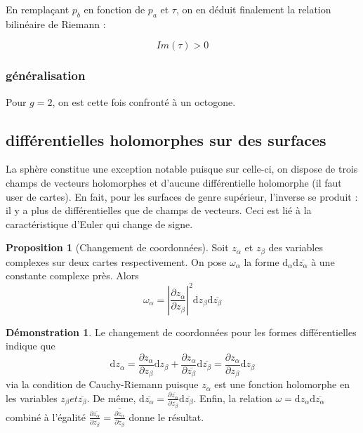 \documentclass{article}
\theoremstyle{definition} %
\newtheorem{prop}{Proposition}
\newtheorem{dem}{Démonstration}
\newcommand{\derp}[2]{\frac{\partial {#1}}{\partial {#2}}}
\newcommand{\dd}{ \mathrm{d}}
\newcommand{\1}{\mathbb{1}} %
\begin{document}
En remplaçant $p_b$ en fonction de $p_a$ et $\tau $, on en déduit finalement la relation bilinéaire de Riemann :

\begin{tcolorbox}[colback=blue!5!white,colframe=blue!75!black,title=Inégalité de Riemann]
$$Im(\tau) > 0$$
\end{tcolorbox}





\subsubsection{généralisation}

Pour $g=2$, on est cette fois confronté à un octogone. 




\subsection{différentielles holomorphes sur des surfaces}

\begin{tcolorbox}[colback=blue!5!white,colframe=blue!75!black,title=Principe]
    La sphère constitue une exception notable puisque sur celle-ci, on dispose de trois champs de vecteurs holomorphes et d'aucune différentielle holomorphe (il faut user de cartes).
    En fait, pour les surfaces de genre supérieur, l'inverse se produit : il y a plus de différentielles que de champs de vecteurs.
    Ceci est lié à la caractéristique d'Euler qui change de signe.
\end{tcolorbox}

\begin{prop}[Changement de coordonnées]
Soit $z_\alpha$ et $z_\beta$ des variables complexes sur deux cartes respectivement.
On pose $\omega_\alpha$ la forme $\dd_\alpha \dd \overline{z_\alpha}$ à une constante complexe près.
Alors 
$$\omega_\alpha=|\frac{\partial z_\alpha}{\partial z_\beta}|^2 \dd z_\beta \dd \overline{z_\beta}$$
\end{prop}

\begin{dem}
Le changement de coordonnées pour les formes différentielles indique que
$$\dd z_\alpha = \derp{z_\alpha}{z_\beta} \dd z_\beta + \derp{z_\alpha}{\overline{z_\beta}} \dd \overline{z_\beta}=\derp{z_\alpha}{z_\beta} \dd z_\beta$$ via la condition de Cauchy-Riemann puisque $z_\alpha$ est une fonction holomorphe en les variables $z_\beta et \overline{z_\beta}$.
De même, $\dd \overline{z_\alpha}= \derp{\overline{z_\alpha}}{\overline{z_\beta}} \dd \overline{z_\beta}$.
Enfin, la relation $\omega = \dd z_\alpha \dd \overline{z_\alpha}$ combiné à l'égalité $\derp{\overline{z_\alpha}}{\overline{z_\beta}}=\overline{\frac{\partial z_\alpha}{\partial z_\beta}}$ donne le résultat.

\end{dem}
\end{document}
